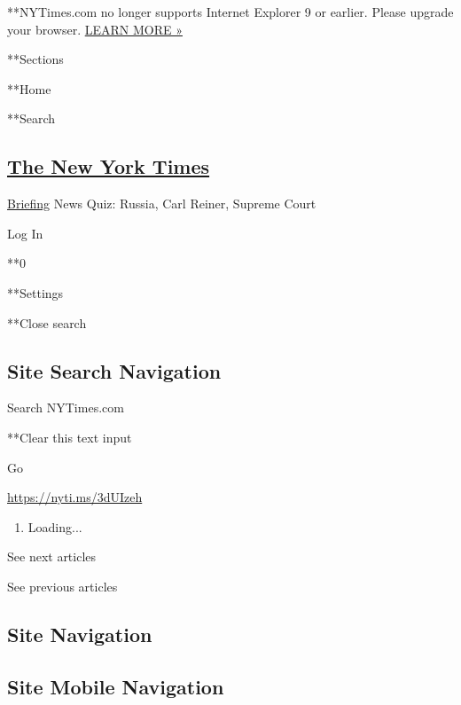  **NYTimes.com no longer supports Internet Explorer 9 or earlier. Please
upgrade your browser.
\href{http://www.nytimes.com/content/help/site/ie9-support.html}{LEARN
MORE »}

**Sections

**Home

**Search

\hypertarget{the-new-york-times}{%
\subsection{\texorpdfstring{\href{http://www.nytimes.com/}{The New York
Times}}{The New York Times}}\label{the-new-york-times}}


\href{/interactive/2018/briefing/global-morning-briefing-newsletter-signup.html}{Briefing}
\textbar{}News Quiz: Russia, Carl Reiner, Supreme Court

Log In

**0

**Settings

**Close search

\hypertarget{site-search-navigation}{%
\subsection{Site Search Navigation}\label{site-search-navigation}}

Search NYTimes.com

**Clear this text input

Go

\url{https://nyti.ms/3dUIzeh}

\begin{enumerate}
\def\labelenumi{\arabic{enumi}.}
\item
  Loading...
\end{enumerate}

See next articles

See previous articles

\hypertarget{site-navigation}{%
\subsection{Site Navigation}\label{site-navigation}}

\hypertarget{site-mobile-navigation}{%
\subsection{Site Mobile Navigation}\label{site-mobile-navigation}}

